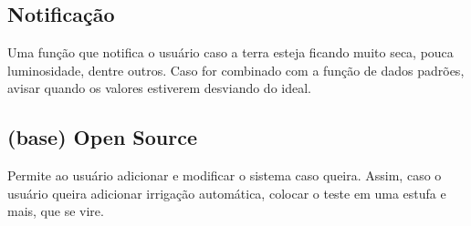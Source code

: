 \documentclass[main.tex]{subfiles}
\begin{document}
\subsection{Notificação}
Uma função que notifica o usuário caso a terra esteja ficando muito seca, pouca luminosidade, dentre outros. Caso for combinado com a função de dados padrões, avisar quando os valores estiverem desviando do ideal. \newline

\subsection{(base) Open Source}
Permite ao usuário adicionar e modificar o sistema caso queira. Assim, caso o usuário queira adicionar irrigação automática, colocar o teste em uma estufa e mais, que se vire.
\end{document}
